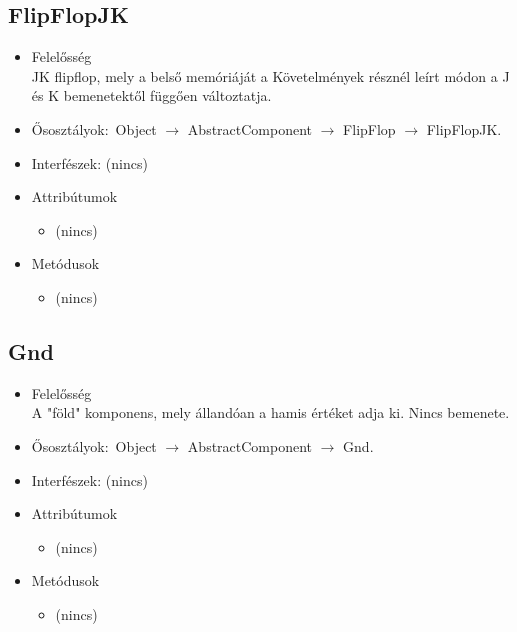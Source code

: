 \subsection{FlipFlopJK}
\begin{itemize}
\item Felelősség\\
JK flipflop, mely a belső memóriáját a Követelmények résznél leírt módon  a J és K bemenetektől függően változtatja.
\item Ősosztályok:\ Object $\rightarrow{}$ AbstractComponent $\rightarrow{}$ FlipFlop $\rightarrow{}$ FlipFlopJK.
\item Interfészek: (nincs)
\item Attribútumok $\ $
\begin{itemize}
\item (nincs)
\end{itemize}
\item Metódusok$\ $
\begin{itemize}
\item (nincs)
\end{itemize}
\end{itemize}

\subsection{Gnd}
\begin{itemize}
\item Felelősség\\
A "föld" komponens, mely állandóan a hamis értéket adja ki. Nincs bemenete.
\item Ősosztályok:\ Object $\rightarrow{}$ AbstractComponent $\rightarrow{}$ Gnd.
\item Interfészek: (nincs)
\item Attribútumok $\ $
\begin{itemize}
\item (nincs)
\end{itemize}
\item Metódusok$\ $
\begin{itemize}
\item (nincs)
\end{itemize}
\end{itemize}

